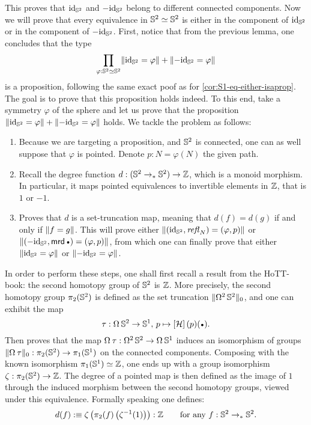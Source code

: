 \documentclass[english,a4]{article}
\renewcommand{\ap}[1]{\left[{#1}\right]}
\newcommand{\ptdto}{\to_\ast}%
\newcommand{\setTrunc}[1]{\Trunc{#1}_0}
\begin{document}
This proves that $\mathord{\mathrm{id}}_{{\mathbb S^{2}}}$ and $-\mathord{\mathrm{id}}_{{\mathbb S^{2}}}$ belong to different connected
components. Now we will prove that every equivalence in ${{\mathbb S^{2}}} \simeq {{\mathbb S^{2}}}$ is
either in the component of $\mathord{\mathrm{id}}_{{\mathbb S^{2}}}$ or in the component of $-\mathord{\mathrm{id}}_{{\mathbb S^{2}}}$. First,
notice that from the previous lemma, one concludes that the type 
\begin{displaymath}
  \prod_{\varphi:{{\mathbb S^{2}}}\simeq{{\mathbb S^{2}}}}\lVert\mathord{\mathrm{id}}_{{\mathbb S^{2}}} = \varphi\rVert + \lVert-\mathord{\mathrm{id}}_{{\mathbb S^{2}}} = \varphi\rVert
\end{displaymath}
is a proposition, following the same exact poof as for
\cref{cor:S1-eq-either-isaprop}. The goal is to prove that this proposition
holds indeed. To this end, take a symmetry $\varphi$ of the sphere and let us
prove that the proposition $\lVert\mathord{\mathrm{id}}_{{\mathbb S^{2}}} = \varphi\rVert + \lVert-\mathord{\mathrm{id}}_{{\mathbb S^{2}}} =
\varphi\rVert$ holds. We tackle the problem as follows: 
\begin{enumerate}
  \item Because we are targeting a proposition, and ${{\mathbb S^{2}}}$ is
    connected, one can as well suppose that $\varphi$ is pointed. Denote $p:N=\varphi(N)$ the given path.
  \item Recall the degree function $d: (\Sp \ptdto \Sp) \to \ZZ$, which is a
    monoid morphism. In particular, it maps pointed equivalences to invertible
    elements in $\mathbb{Z}$, that is $1$ or $-1$.
  \item Proves that $d$ is a set-truncation map, meaning that $d(f)=d(g)$ if and
    only if $\lVert f=g\rVert$. This will prove either $\lVert(\mathord{\mathrm{id}}_{{\mathbb S^{2}}},\mathop{{\mathit{refl}}_{N}})=(\varphi,p)\rVert$ or $\Trunc{(-\id_\Sp,\mrd\base)=(\varphi,p)}$, from which
    one can finally prove that either $\lVert\mathord{\mathrm{id}}_{{\mathbb S^{2}}} = \varphi\rVert$ or
    $\lVert-\mathord{\mathrm{id}}_{{\mathbb S^{2}}} = \varphi\rVert$.
\end{enumerate}

In order to perform these steps, one shall first recall a result from the
HoTT-book: the second homotopy group of ${{\mathbb S^{2}}}$ is $\mathbb{Z}$. More precisely, the
second homotopy group $\pi_2({{\mathbb S^{2}}})$ is defined as the set truncation
$\setTrunc{\loopspace 2 \Sp}$, and one can exhibit the map
\begin{displaymath}
  \tau: \loopspace\null\Sp \to \Sc, \, p \mapsto \ap\hopf(p)(\base).
\end{displaymath}
Then \cite[Theorem ??]{HoTT} proves that the map $\loopspace\null\tau :
\loopspace 2 \Sp \to \loopspace \null \Sc$ induces an isomorphism of groups
$\setTrunc{\loopspace\null\tau}: \pi_2(\Sp) \to \pi_1(\Sc)$ on the connected
components. Composing with the known isomorphism $\pi_1({{\mathbb S^{1}}}) \simeq \mathbb{Z}$, one
ends up with a group isomorphism $\zeta: \pi_2({{\mathbb S^{2}}}) \to \mathbb{Z}$. The degree of a
pointed map is then defined as the image of $1$ through the induced morphism
between the second homotopy groups, viewed under this equivalence. Formally
speaking one defines: 
\begin{displaymath}
  d(f) \defequi \zeta\left(\pi_2(f)\left(\inv\zeta(1)\right)\right):\ZZ \qquad
  \text{for any}\ f:\Sp\ptdto\Sp.
\end{displaymath}
\end{document}
